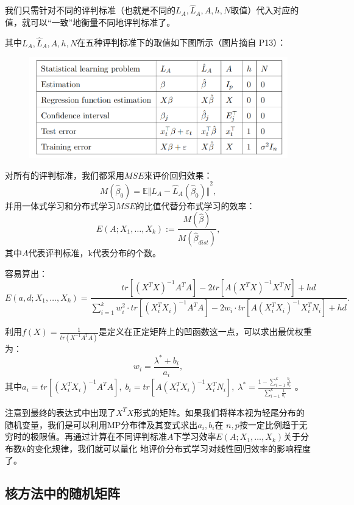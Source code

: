 \documentclass[UTF8,12pt]{ctexart}
\begin{document}
我们只需针对不同的评判标准（也就是不同的$L_A, \hat L_A, A, h, N$取值）代入对应的值，就可以“一致”地衡量不同地评判标准了。

其中$L_A, \hat L_A, A, h, N$在五种评判标准下的取值如下图所示（图片摘自\cite{random2} P13）：

\newpage 

\begin{figure}[htbp]
    \centering
    \includegraphics[width=1\textwidth]{linear.png}
\end{figure}

对所有的评判标准，我们都采用$MSE$来评价回归效果：
\[
    M(\hat\beta_0) = \mathbb E {\Vert L_A - \hat L_A (\hat\beta_0) \Vert }^2,
\]  
并用一体式学习和分布式学习$MSE$的比值代替分布式学习的效率：
\[
    E(A;X_1,\ldots,X_k) := \frac{M(\hat \beta)}{M(\hat \beta_{dist})},
\]  
其中$A$代表评判标准，k代表分布的个数。

容易算出：
\[
    E(a,d;X_1,\ldots,X_k) = \frac{
        tr[{(X^T X)}^{-1}A^T A] - 2tr[{A(X^T X)}^{-1}X^T N] + hd
    }
    {
        \sum\limits_{i=1}^k w_i^2 \cdot tr[{(X_i^T X_i)}^{-1}A^T A] -2w_i \cdot tr[A{(X_i^T X_i)}^{-1}X_i^T N_i] + hd
    }.
\] 

利用$f(X) = \frac{1}{tr(X^{-1}A^T A)}$是定义在正定矩阵上的凹函数这一点，可以求出最优权重为：
\[
    w_i= \frac{\lambda^* + b_i}{a_i},
\]  
其中$a_i=tr[{(X_i^T X_i)}^{-1}A^T A], \; b_i = tr[A{(X_i^T X_i)}^{-1}X_i^T N_i], \; \lambda^* = \frac{
    1-\sum\limits_{i=1}^k\frac{b_i}{a_i}
}{
    \sum\limits_{i=1}^k\frac{1}{a_i}
}$ 。

注意到最终的表达式中出现了$X^T X$形式的矩阵。如果我们将样本视为轻尾分布的随机变量，我们是可以利用MP分布律及其变式求出$a_i,b_i$在
$n,p$按一定比例趋于无穷时的极限值。再通过计算在不同评判标准$A$下学习效率$E(A;X_1,\ldots,X_k)$关于分布数$k$的变化规律，我们就可以量化
地评价分布式学习对线性回归效率的影响程度了。

\subsection{核方法中的随机矩阵}
\end{document}
